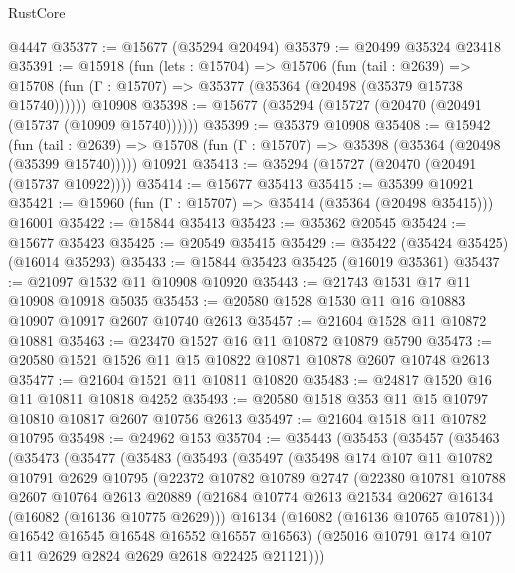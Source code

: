 \begin{lexlean}{RustCore}
\begin{coremodule}
    @4447
@35377 := @15677 (@35294 @20494)
@35379 := @20499 @35324 @23418
@35391 := @15918
    (fun (lets : @15704) =>
    @15706
      (fun (tail : @2639) =>
      @15708 (fun (Γ : @15707) => @35377 (@35364 (@20498 (@35379 @15738 @15740))))))
    @10908
@35398 := @15677 (@35294 (@15727 (@20470 (@20491 (@15737 (@10909 @15740))))))
@35399 := @35379 @10908
@35408 := @15942
    (fun (tail : @2639) => @15708 (fun (Γ : @15707) => @35398 (@35364 (@20498 (@35399 @15740)))))
    @10921
@35413 := @35294 (@15727 (@20470 (@20491 (@15737 @10922))))
@35414 := @15677 @35413
@35415 := @35399 @10921
@35421 := @15960 (fun (Γ : @15707) => @35414 (@35364 (@20498 @35415))) @16001
@35422 := @15844 @35413
@35423 := @35362 @20545
@35424 := @15677 @35423
@35425 := @20549 @35415
@35429 := @35422 (@35424 @35425) (@16014 @35293)
@35433 := @15844 @35423 @35425 (@16019 @35361)
@35437 := @21097 @1532 @11 @10908 @10920
@35443 := @21743 @1531 @17 @11 @10908 @10918 @5035
@35453 := @20580 @1528 @1530 @11 @16 @10883 @10907 @10917 @2607 @10740 @2613
@35457 := @21604 @1528 @11 @10872 @10881
@35463 := @23470 @1527 @16 @11 @10872 @10879 @5790
@35473 := @20580 @1521 @1526 @11 @15 @10822 @10871 @10878 @2607 @10748 @2613
@35477 := @21604 @1521 @11 @10811 @10820
@35483 := @24817 @1520 @16 @11 @10811 @10818 @4252
@35493 := @20580 @1518 @353 @11 @15 @10797 @10810 @10817 @2607 @10756 @2613
@35497 := @21604 @1518 @11 @10782 @10795
@35498 := @24962 @153
@35704 := @35443
    (@35453
      (@35457
        (@35463
          (@35473
            (@35477
              (@35483
                (@35493
                  (@35497
                    (@35498
                      @174
                      @107
                      @11
                      @10782
                      @10791
                      @2629
                      @10795
                      (@22372
                        @10782
                        @10789
                        @2747
                        (@22380
                          @10781
                          @10788
                          @2607
                          @10764
                          @2613
                          @20889
                          (@21684 @10774 @2613 @21534 @20627 @16134 (@16082 (@16136 @10775 @2629)))
                          @16134
                          (@16082 (@16136 @10765 @10781)))
                        @16542
                        @16545
                        @16548
                        @16552
                        @16557
                        @16563)
                      (@25016 @10791 @174 @107 @11 @2629 @2824 @2629 @2618 @22425 @21121)))

\end{coremodule}
\end{lexlean}
